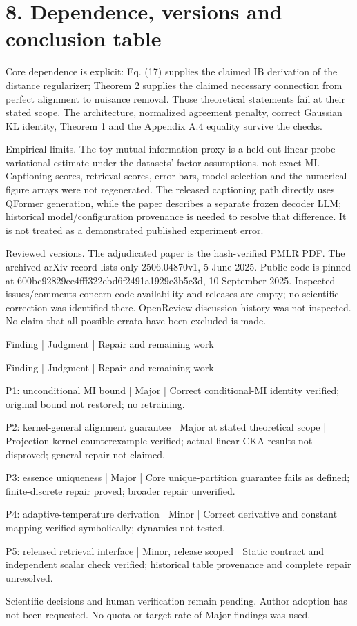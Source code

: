 \documentclass[10pt]{article}
\begin{document}
\section*{8. Dependence, versions and conclusion table}
Core dependence is explicit: Eq. (17) supplies the claimed IB derivation of the distance regularizer; Theorem 2 supplies the claimed necessary connection from perfect alignment to nuisance removal. Those theoretical statements fail at their stated scope. The architecture, normalized agreement penalty, correct Gaussian KL identity, Theorem 1 and the Appendix A.4 equality survive the checks.\par
Empirical limits. The toy mutual-information proxy is a held-out linear-probe variational estimate under the datasets’ factor assumptions, not exact MI. Captioning scores, retrieval scores, error bars, model selection and the numerical figure arrays were not regenerated. The released captioning path directly uses QFormer generation, while the paper describes a separate frozen decoder LLM; historical model/configuration provenance is needed to resolve that difference. It is not treated as a demonstrated published experiment error.\par
Reviewed versions. The adjudicated paper is the hash-verified PMLR PDF. The archived arXiv record lists only 2506.04870v1, 5 June 2025. Public code is pinned at 600bc92829ce4fff322ebd6f2491a1929c3b5c3d, 10 September 2025. Inspected issues/comments concern code availability and releases are empty; no scientific correction was identified there. OpenReview discussion history was not inspected. No claim that all possible errata have been excluded is made.\par
Finding | Judgment | Repair and remaining work\par
Finding | Judgment | Repair and remaining work\par
P1: unconditional MI bound | Major | Correct conditional-MI identity verified; original bound not restored; no retraining.\par
P2: kernel-general alignment guarantee | Major at stated theoretical scope | Projection-kernel counterexample verified; actual linear-CKA results not disproved; general repair not claimed.\par
P3: essence uniqueness | Major | Core unique-partition guarantee fails as defined; finite-discrete repair proved; broader repair unverified.\par
P4: adaptive-temperature derivation | Minor | Correct derivative and constant mapping verified symbolically; dynamics not tested.\par
P5: released retrieval interface | Minor, release scoped | Static contract and independent scalar check verified; historical table provenance and complete repair unresolved.\par
Scientific decisions and human verification remain pending. Author adoption has not been requested. No quota or target rate of Major findings was used.\par
\end{document}
